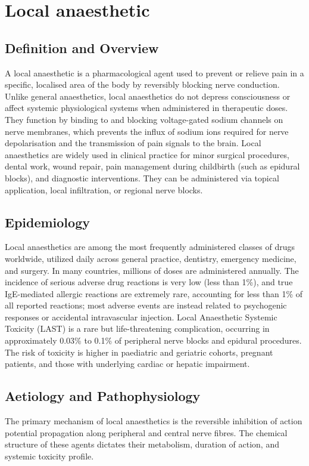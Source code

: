 \chapter{Local anaesthetic}

\section*{Definition and Overview}
A local anaesthetic is a pharmacological agent used to prevent or relieve pain in a specific, localised area of the body by reversibly blocking nerve conduction. Unlike general anaesthetics, local anaesthetics do not depress consciousness or affect systemic physiological systems when administered in therapeutic doses. They function by binding to and blocking voltage-gated sodium channels on nerve membranes, which prevents the influx of sodium ions required for nerve depolarisation and the transmission of pain signals to the brain. Local anaesthetics are widely used in clinical practice for minor surgical procedures, dental work, wound repair, pain management during childbirth (such as epidural blocks), and diagnostic interventions. They can be administered via topical application, local infiltration, or regional nerve blocks.

\section*{Epidemiology}
Local anaesthetics are among the most frequently administered classes of drugs worldwide, utilized daily across general practice, dentistry, emergency medicine, and surgery. In many countries, millions of doses are administered annually. The incidence of serious adverse drug reactions is very low (less than 1\%), and true IgE-mediated allergic reactions are extremely rare, accounting for less than 1\% of all reported reactions; most adverse events are instead related to psychogenic responses or accidental intravascular injection. Local Anaesthetic Systemic Toxicity (LAST) is a rare but life-threatening complication, occurring in approximately 0.03\% to 0.1\% of peripheral nerve blocks and epidural procedures. The risk of toxicity is higher in paediatric and geriatric cohorts, pregnant patients, and those with underlying cardiac or hepatic impairment.

\section*{Aetiology and Pathophysiology}
The primary mechanism of local anaesthetics is the reversible inhibition of action potential propagation along peripheral and central nerve fibres. The chemical structure of these agents dictates their metabolism, duration of action, and systemic toxicity profile.

